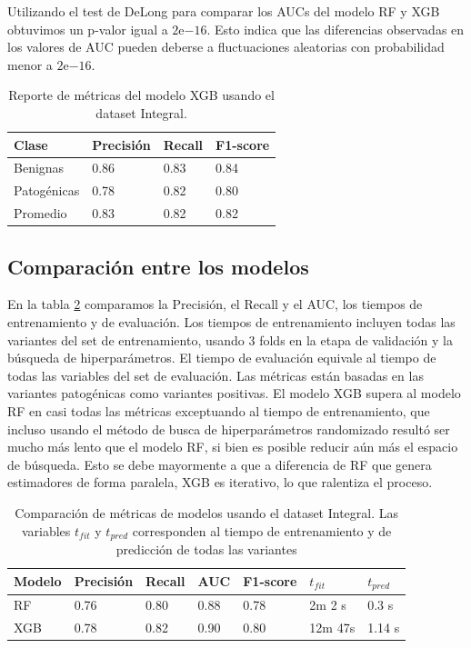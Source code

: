 Utilizando el test de DeLong para comparar los AUCs del modelo RF y XGB obtuvimos un p-valor igual a $2\mathrm{e}{-16}$. Esto indica que las diferencias observadas en los valores de AUC pueden deberse a fluctuaciones aleatorias con probabilidad menor a $2\mathrm{e}{-16}$.

\begin{table}[H]
\centering
\begin{tabular}{|l|l|l|l|}
\hline
Clase        & Precisión & Recall & F1-score \\ \hline
Benignas     & 0.86      & 0.83   & 0.84     \\ \hline
Patogénicas  & 0.78      & 0.82   & 0.80     \\ \hline
Promedio     & 0.83      & 0.82   & 0.82     \\ \hline
\end{tabular}
\caption{Reporte de métricas del modelo XGB usando el dataset Integral.}
\label{tab:metrics_integral_xgb}
\end{table}

\subsection{Comparación entre los modelos}

En la tabla \ref{tab:metrics_model_integral} comparamos la Precisión, el Recall y el AUC, los tiempos de entrenamiento y de evaluación. Los tiempos de entrenamiento incluyen todas las variantes del set de entrenamiento, usando 3 folds en la etapa de validación y la búsqueda de hiperparámetros. El tiempo de evaluación equivale al tiempo de todas las variables del set de evaluación. Las métricas están basadas en las variantes patogénicas como variantes positivas. El modelo XGB supera al modelo RF en casi todas las métricas exceptuando al tiempo de entrenamiento, que incluso usando el método de busca de hiperparámetros randomizado resultó ser mucho más lento que el modelo RF, si bien es posible reducir aún más el espacio de búsqueda. Esto se debe mayormente a que a diferencia de RF que genera estimadores de forma paralela, XGB es iterativo, lo que ralentiza el proceso. 

\begin{table}[H]
\centering
\begin{tabular}{|l|l|l|l|l|l|l|}
\hline
Modelo & Precisión & Recall & AUC & F1-score & $t_{fit}$ & $t_{pred}$ \\ \hline
RF & 0.76 & 0.80 & 0.88 & 0.78 & 2m 2 s & 0.3 s \\ \hline
XGB & 0.78 & 0.82 & 0.90 & 0.80 & 12m 47s & 1.14 s \\ \hline
\end{tabular}
\caption{Comparación de métricas de modelos usando el dataset Integral. Las variables $t_{fit}$ y $t_{pred}$ corresponden al tiempo de entrenamiento y de predicción de todas las variantes}
\label{tab:metrics_model_integral}
\end{table}

